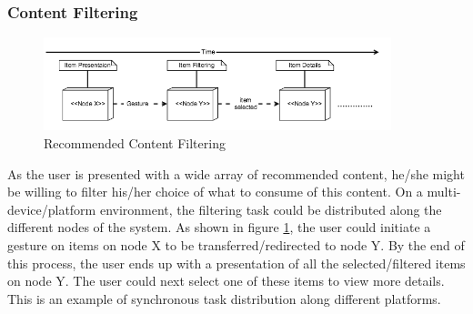 \subsubsection{Content Filtering}
\begin{figure}[!htpb]
\includegraphics[width=0.9\textwidth, center, center]{figures/generic4}
\caption{Recommended Content Filtering}
\label{fig:figure34}
\end{figure}
As the user is presented with a wide array of recommended content, he/she might be willing to filter his/her choice of what to consume of this content. On a multi-device/platform environment, the filtering task could be distributed along the different nodes of the system. As shown in figure \ref{fig:figure34}, the user could initiate a gesture on items on node X to be transferred/redirected to node Y. By the end of this process, the user ends up with a presentation of all the selected/filtered items on node Y. The user could next select one of these items to view more details. This is an example of synchronous task distribution along different platforms.
  
